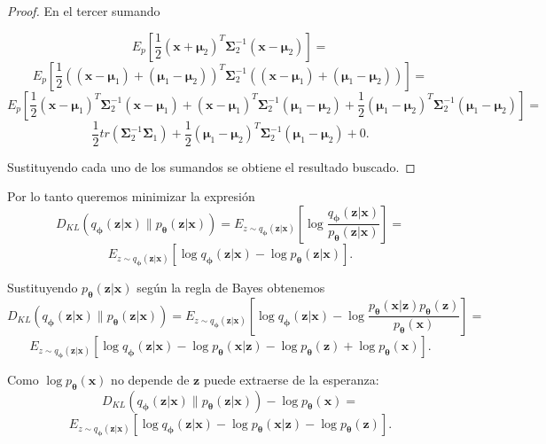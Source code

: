 \begin{proof}
En el tercer sumando

$$E_p\left[\frac{1}{2}(\textbf{x} + \boldsymbol{\mu}_2)^T\boldsymbol{\Sigma}_2^{-1}(\textbf{x} - \boldsymbol{\mu}_2) \right] =$$ $$E_p\left[\frac{1}{2}((\textbf{x} - \boldsymbol{\mu}_1) + (\boldsymbol{\mu}_1 - \boldsymbol{\mu}_2))^T\boldsymbol{\Sigma}_2^{-1}((\textbf{x} - \boldsymbol{\mu}_1) + (\boldsymbol{\mu}_1 - \boldsymbol{\mu}_2)) \right] = $$ $$ E_p \left[\frac{1}{2} (\textbf{x} - \boldsymbol{\mu}_1)^T\boldsymbol{\Sigma}_2^{-1}(\textbf{x} - \boldsymbol{\mu}_1) + (\textbf{x} - \boldsymbol{\mu}_1)^T\boldsymbol{\Sigma}_2^{-1}(\boldsymbol{\mu}_1 - \boldsymbol{\mu}_2) + \frac{1}{2} (\boldsymbol{\mu}_1 - \boldsymbol{\mu}_2)^T\boldsymbol{\Sigma}_2^{-1}(\boldsymbol{\mu}_1 - \boldsymbol{\mu}_2) \right] = $$ $$ \frac{1}{2} tr(\boldsymbol{\Sigma}_2^{-1}{\boldsymbol{\Sigma}_1}) + \frac{1}{2}(\boldsymbol{\mu}_1 - \boldsymbol{\mu}_2)^T\boldsymbol{\Sigma}_2^{-1}(\boldsymbol{\mu}_1 - \boldsymbol{\mu}_2) + 0. $$

Sustituyendo cada uno de los sumandos se obtiene el resultado buscado.

\end{proof}

Por lo tanto queremos minimizar la expresión $$D_{KL}(q_{\boldsymbol{\phi}}(\textbf{z}|\textbf{x}) \parallel p_{\boldsymbol{\theta}}(\textbf{z}|\textbf{x})) = E_{z \sim q_{\boldsymbol{\phi}} (\textbf{z}|\textbf{x})} \left[ \log \frac{q_{\boldsymbol{\phi}}(\textbf{z}|\textbf{x})}{p_{\boldsymbol{\theta}}(\textbf{z}|\textbf{x})} \right]=$$ $$ E_{z \sim q_{\boldsymbol{\phi}} (\textbf{z}|\textbf{x})} \left[ \log q_{\boldsymbol{\phi}}(\textbf{z}|\textbf{x}) - \log p_{\boldsymbol{\theta}}(\textbf{z}|\textbf{x}) \right].$$

Sustituyendo $p_{\boldsymbol{\theta}}(\textbf{z}|\textbf{x})$ según la regla de Bayes obtenemos $$ D_{KL}(q_{\boldsymbol{\phi}}(\textbf{z}|\textbf{x}) \parallel p_{\boldsymbol{\theta}}(\textbf{z}|\textbf{x})) = E_{z \sim q_{\boldsymbol{\phi}} (\textbf{z}|\textbf{x})} \left[ \log q_{\boldsymbol{\phi}}(\textbf{z}|\textbf{x}) - \log  \frac{p_{\boldsymbol{\theta}}(\textbf{x}|\textbf{z})p_{\boldsymbol{\theta}}(\textbf{z})}{p_{\boldsymbol{\theta}}(\textbf{x})}\right]=$$ $$ E_{z \sim q_{\boldsymbol{\phi}} (\textbf{z}|\textbf{x})} \left[ \log q_{\boldsymbol{\phi}}(\textbf{z}|\textbf{x}) - \log  p_{\boldsymbol{\theta}}(\textbf{x}|\textbf{z}) - \log p_{\boldsymbol{\theta}}(\textbf{z}) + \log p_{\boldsymbol{\theta}}(\textbf{x})\right].$$

Como $\log p_{\boldsymbol{\theta}}(\textbf{x})$ no depende de $\textbf{z}$ puede extraerse de la esperanza: $$ D_{KL}(q_{\boldsymbol{\phi}}(\textbf{z}|\textbf{x}) \parallel p_{\boldsymbol{\theta}}(\textbf{z}|\textbf{x})) - \log p_{\boldsymbol{\theta}}(\textbf{x}) =$$ $$ E_{z \sim q_{\boldsymbol{\phi}} (\textbf{z}|\textbf{x})} \left[ \log q_{\boldsymbol{\phi}}(\textbf{z}|\textbf{x}) - \log  p_{\boldsymbol{\theta}}(\textbf{x}|\textbf{z}) - \log p_{\boldsymbol{\theta}}(\textbf{z})\right].$$

